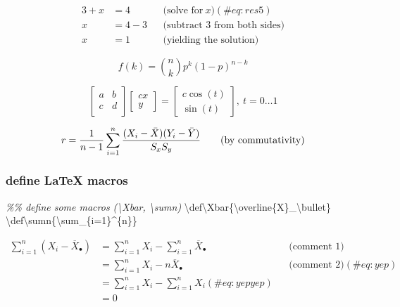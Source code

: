 \documentclass[
]{article}
\newenvironment{Shaded}{\begin{snugshade}}{\end{snugshade}}
\newcommand{\CommentTok}[1]{\textcolor[rgb]{0.56,0.35,0.01}{\textit{#1}}}
\newcommand{\FunctionTok}[1]{\textcolor[rgb]{0.00,0.00,0.00}{#1}}
\newcommand{\NormalTok}[1]{#1}
\begin{document}
\[
\begin{align}
  3 + x & = 4 && \text{(solve for} ~ x \text{)} (\#eq:res5) \\
  x & = 4 - 3 && \text{(subtract 3 from both sides)} \\
  x & = 1   && \text{(yielding the solution)}
\end{align}
\]

\[
\begin{equation}   
  f\left(k\right) = \binom{n}{k} p^k(1 - p)^{n-k}
\end{equation}
\]

\[
\left[\begin{matrix}
  a & b \\
  c & d \\
\end{matrix}\right]
\left[\begin{matrix}
  {cx} \\ 
  y 
\end{matrix}\right] = 
\left[\begin{matrix}
  {c} \cos \left(t \right) \\ 
  \sin \left(t \right) 
\end{matrix}\right], ~ t = 0…1
\]

\[
\begin{equation}
  r = \frac{1}{n-1} \sum_{i=1}^{n} \frac{(X_i - \bar {X})(Y_i - \bar{Y})}{S_xS_y} 
\tag{by commutativity} \\    
\end{equation}
\]

\hypertarget{define-latex-macros}{%
\subsubsection{define LaTeX macros}\label{define-latex-macros}}

\begin{Shaded}
\begin{Highlighting}[]
\CommentTok{\%\% define some macros (\textbackslash{}Xbar, \textbackslash{}sumn)}
\FunctionTok{\textbackslash{}def\textbackslash{}Xbar}\NormalTok{\{}\FunctionTok{\textbackslash{}overline}\NormalTok{\{X\}\_}\FunctionTok{\textbackslash{}bullet}\NormalTok{\}}
\FunctionTok{\textbackslash{}def\textbackslash{}sumn}\NormalTok{\{}\FunctionTok{\textbackslash{}sum}\NormalTok{\_\{i=1\}\^{}\{n\}\}}
\end{Highlighting}
\end{Shaded}

\[
\begin{align}
\sum_{i=1}^{n}\left(X_i - \overline{X}_\bullet\right)
  & = \sum_{i=1}^{n}X_i - \sum_{i=1}^{n}\overline{X}_\bullet && \text{(comment 1)} \\
  & = \sum_{i=1}^{n}X_i - n \overline{X}_\bullet && \text{(comment 2)} (\#eq:yep) \\
  & = \sum_{i=1}^{n}X_i - \sum_{i=1}^{n}X_i (\#eq:yepyep)\\
  & = 0
\end{align} 
\]
\end{document}
